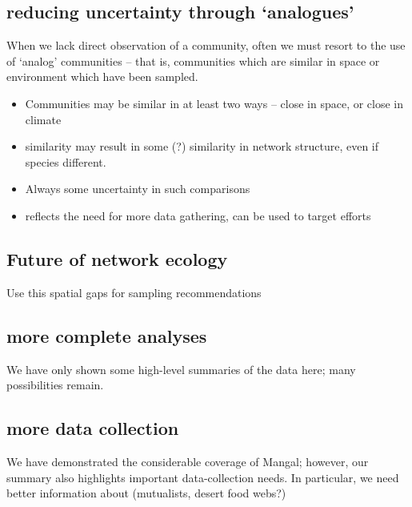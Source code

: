 \hypertarget{reducing-uncertainty-through-analogues}{%
\subsection{reducing uncertainty through
`analogues'}\label{reducing-uncertainty-through-analogues}}

When we lack direct observation of a community, often we must resort to
the use of `analog' communities -- that is, communities which are
similar in space or environment which have been sampled.

\begin{itemize}
\tightlist
\item
  Communities may be similar in at least two ways -- close in space, or
  close in climate
\item
  similarity may result in some (?) similarity in network structure,
  even if species different.
\item
  Always some uncertainty in such comparisons
\item
  reflects the need for more data gathering, can be used to target
  efforts
\end{itemize}

\hypertarget{future-of-network-ecology}{%
\subsection{Future of network ecology}\label{future-of-network-ecology}}

Use this spatial gaps for sampling recommendations

\hypertarget{more-complete-analyses}{%
\subsection{more complete analyses}\label{more-complete-analyses}}

We have only shown some high-level summaries of the data here; many
possibilities remain.

\hypertarget{more-data-collection}{%
\subsection{more data collection}\label{more-data-collection}}

We have demonstrated the considerable coverage of Mangal; however, our
summary also highlights important data-collection needs. In particular,
we need better information about (mutualists, desert food webs?)

